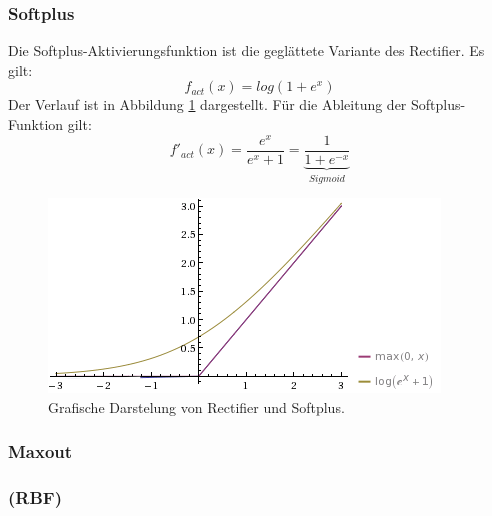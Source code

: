\subsubsection*{Softplus}
Die Softplus-Aktivierungsfunktion ist die geglättete Variante des Rectifier. Es gilt:
\[
	f_{act}(x) = log(1 + e^x)
\]
Der Verlauf ist in Abbildung \ref{fig:ch01_fact-softplus} dargestellt. Für die Ableitung der Softplus-Funktion gilt:
\[
	f'_{act}(x) = \frac{e^x}{e^x + 1} = 
		\underbrace{\frac{1}{1 + e^{-x}}}_{Sigmoid}
\]

\begin{figure}[ht!] \centering 
	\includegraphics[width=\linewidth]{figures/ch01_fact-softplus.png}
	\caption{Grafische Darstelung von Rectifier und Softplus.}
	\label{fig:ch01_fact-softplus}
\end{figure}

\subsubsection*{Maxout}

\subsubsection*{(RBF)}

